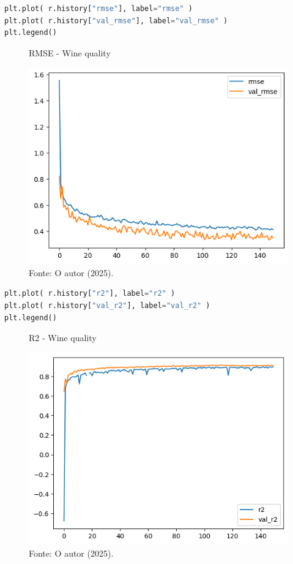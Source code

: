 \begin{lstlisting}[language=Python, style=input]
plt.plot( r.history["rmse"], label="rmse" )
plt.plot( r.history["val_rmse"], label="val_rmse" )
plt.legend()
\end{lstlisting}
\begin{figure}[H]
\centering
\caption{RMSE - Wine quality}
\includegraphics[width=.8\linewidth]{apendices/fig/13_IAA012_7.png}
\caption*{Fonte: O autor (2025).}
\end{figure}

\begin{lstlisting}[language=Python, style=input]
plt.plot( r.history["r2"], label="r2" )
plt.plot( r.history["val_r2"], label="val_r2" )
plt.legend()
\end{lstlisting}
\begin{figure}[H]
\centering
\caption{R2 - Wine quality}
\includegraphics[width=.8\linewidth]{apendices/fig/13_IAA012_8.png}
\caption*{Fonte: O autor (2025).}
\end{figure}
